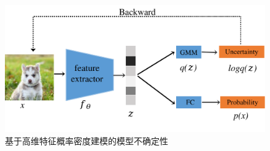 \begin{figure}[h]
    \centering
    \includegraphics[width=1.\linewidth]{assets/structure1.png}
    \caption{基于高维特征概率密度建模的模型不确定性}
    \label{tag:模型结构图1}
\end{figure}

    

